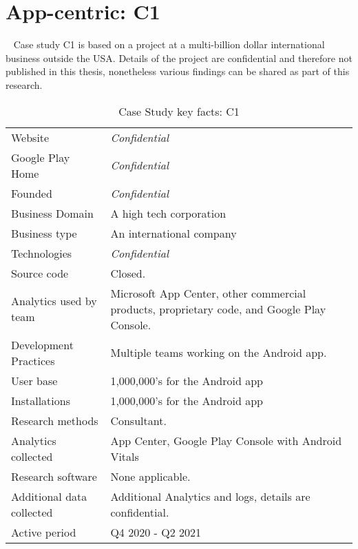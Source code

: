 \section{App-centric: C1}~\label{case-study-overview-C1}
Case study C1 is based on a project at a multi-billion dollar international business outside the USA. Details of the project are confidential and therefore not published in this thesis, nonetheless various findings can be shared as part of this research. 

{\renewcommand{\arraystretch}{0.8}%
\begin{table*}
    \centering
    \small
    \setlength{\tabcolsep}{6pt}
    \begin{tabular}{lp{9cm}}
       \toprule
       Website &\textit{Confidential} \\
       Google Play Home & \textit{Confidential} \\
       Founded & \textit{Confidential} \\
       Business Domain & A high tech corporation \\
       Business type & An international company \\
       Technologies  & \textit{Confidential} \\
       Source code  &Closed. \\
       Analytics used by team & Microsoft App Center, other commercial products, proprietary code, and Google Play Console. \\
       Development Practices & Multiple teams working on the Android app. \\
       \midrule
       User base & 1,000,000's for the Android app \\
       Installations & 1,000,000's for the Android app \\
       \midrule
       Research methods &Consultant. \\
       Analytics collected &App Center, Google Play Console with Android Vitals \\
       Research software & None applicable. \\
       Additional data collected &Additional Analytics and logs, details are confidential. \\
       Active period & Q4 2020 - Q2 2021 \\
       \bottomrule
    \end{tabular}
    \caption{Case Study key facts: C1}
    \label{tab:commercial_case_study_anaytics_overview}
\end{table*}
}

